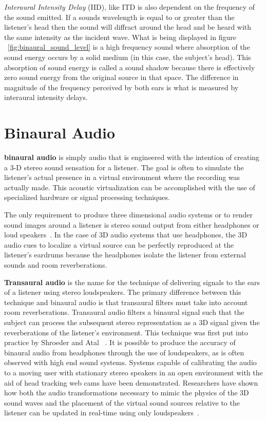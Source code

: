 \textit{Interaural Intensity Delay} (IID), like ITD is also dependent on the
frequency of the sound emitted.  If a sounds wavelength is equal to or greater
than the listener's head then the sound will diffract around the head and be
heard with the same intensity as the incident wave.  What is being displayed in
figure ~\ref{fig:binaural_sound_level} is a high frequency sound where
absorption of the sound energy occurs by a solid medium (in this case, the
subject's head). This absorption of sound energy is called a sound shadow
because there is effectively zero sound energy from the original source in that
space. The  difference in magnitude of the frequency perceived by both ears is
what is  measured by interaural intensity delays.


\section{                  Binaural Audio                                     }

\textbf{binaural audio} is simply audio that is engineered with the intention
of creating a 3-D stereo sound sensation for a listener.  The goal is often to
simulate the listener's actual presence in a virtual environment where the
recording was actually made. This acoustic virtualization can be accomplished
with the use of specialized hardware or signal processing techniques.

The only requirement to produce three dimensional audio systems or to render
sound images around a listener is stereo sound output from either headphones
or loud speakers~\cite{thackara2005bubble}. In the case of 3D audio systems
that use headphones, the 3D audio cues to localize a virtual source can be
perfectly reproduced at the listener’s eardrums because the headphones isolate
the listener from external sounds and room reverberations.

\textbf{Transaural audio} is the name for the technique of delivering signals to
the ears of a listener using stereo loudspeakers. The primary difference between
this technique and binaural audio is that transaural filters must take into
account room reverberations.  Transaural audio filters a binaural signal such
that the subject can process the subsequent stereo representation as a 3D signal
given the reverberations of the listener's environment.  This technique was
first put into practice by Shroeder and Atal ~\cite{ schroeder1963computer,
schroeder1970digital }. It is possible to produce the accuracy of binaural audio
from headphones through the use of loudspeakers, as is often observed with high
end sound systems. Systems capable of calibrating the audio to a moving user
with stationary stereo speakers in an open  environment with the aid of head
tracking web cams have been demonstrated. Researchers have shown how both the
audio transformations necessary to mimic the physics of the 3D sound waves and
the placement of the virtual sound sources relative to the listener can be
updated in real-time using only loudspeakers~\cite{song2010personal}.

